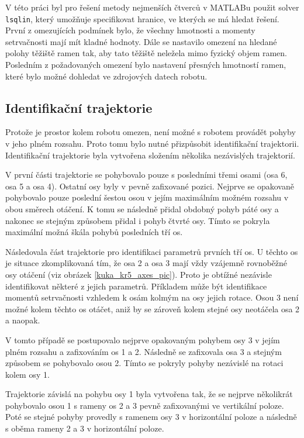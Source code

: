 V této práci byl pro řešení metody nejmenších čtverců v MATLABu použit solver \texttt{lsqlin}, který umožňuje specifikovat hranice, ve kterých se má hledat řešení. První z omezujících podmínek bylo, že všechny hmotnosti a momenty setrvačnosti mají mít kladné hodnoty. Dále se nastavilo omezení na hledané polohy těžiště ramen tak, aby tato těžiště neležela mimo fyzický objem ramen. Posledním z požadovaných omezení bylo nastavení přesných hmotností ramen, které bylo možné dohledat ve zdrojových datech robotu.

\label{postup_identifikace_ch}

\subsection{Identifikační trajektorie}

Protože je prostor kolem robotu omezen, není možné s robotem provádět pohyby v jeho plném rozsahu. Proto tomu bylo nutné přizpůsobit identifikační trajektorii. Identifikační trajektorie byla vytvořena složením několika nezávislých trajektorií. 

V první části trajektorie se pohybovalo pouze s posledními třemi osami (osa 6, osa 5 a osa 4). Ostatní osy byly v pevně zafixované pozici. Nejprve se opakovaně pohybovalo pouze poslední šestou osou v jejím maximálním možném rozsahu v obou směrech otáčení. K tomu se následně přidal obdobný pohyb páté osy a nakonec se stejným způsobem přidal i pohyb čtvrté osy. Tímto se pokryla maximální možná škála pohybů posledních tří os.

Následovala část trajektorie pro identifikaci parametrů prvních tří os. U těchto os je situace zkomplikovaná tím, že osa 2 a osa 3 mají vždy vzájemně rovnoběžné osy otáčení (viz obrázek \ref{kuka_kr5_axes_pic}). Proto je obtížné nezávisle identifikovat některé z jejich parametrů. Příkladem může být identifikace momentů setrvačnosti vzhledem k osám kolmým na osy jejich rotace. Osou 3 není možné kolem těchto os otáčet, aniž by se zároveň kolem stejné osy neotáčela osa 2 a naopak.    

V tomto případě se postupovalo nejprve opakovaným pohybem osy 3 v jejím plném rozsahu a zafixováním os 1 a 2. Následně se zafixovala osa 3 a stejným způsobem se pohybovalo osou 2. Tímto se pokryly pohyby nezávislé na rotaci kolem osy 1. 

Trajektorie závislá na pohybu osy 1 byla vytvořena tak, že se nejprve několikrát pohybovalo osou 1 s rameny os 2 a 3 pevně zafixovanými ve vertikální poloze. Poté se stejné pohyby provedly s ramenem osy 3 v horizontální poloze a následně s oběma rameny 2 a 3 v horizontální poloze.

